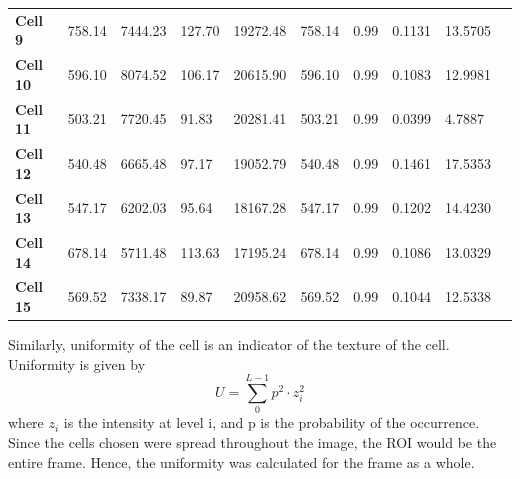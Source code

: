 \documentclass{article}
\begin{document}
\begin{table}[h!]
\begin{tabular}{ |p{1.2cm}|p{1.5cm}|p{1.5cm}|p{1.7cm}|p{1.7cm}|p{1.7cm}|p{1.7cm}|p{1.7cm}|p{1.7cm}|p{1.7cm}| }
\textbf{Cell 9} & 758.14 & 7444.23 & 127.70 & 19272.48 & 758.14 & 0.99 & 0.1131 & 13.5705\\
\textbf{Cell 10} & 596.10 & 8074.52 & 106.17 & 20615.90 & 596.10 & 0.99 & 0.1083 & 12.9981\\
\textbf{Cell 11} & 503.21 & 7720.45 & 91.83 & 20281.41 & 503.21 & 0.99 & 0.0399 & 4.7887\\
\textbf{Cell 12} & 540.48 & 6665.48 & 97.17 & 19052.79 & 540.48 & 0.99 & 0.1461 & 17.5353\\
\textbf{Cell 13} & 547.17 & 6202.03 & 95.64 & 18167.28 & 547.17 & 0.99 & 0.1202 & 14.4230\\
\textbf{Cell 14} & 678.14 & 5711.48 & 113.63 & 17195.24 & 678.14 & 0.99 & 0.1086 &  13.0329\\
\textbf{Cell 15} & 569.52 & 7338.17 & 89.87 & 20958.62 & 569.52 & 0.99 & 0.1044 & 12.5338\\
\hline
\end{tabular}
\end{table}
\clearpage
Similarly, uniformity of the cell is an indicator of the texture of the cell. Uniformity is given by 
\begin{equation*}
    \displaystyle{U} = \sum_0^{L-1}p^2 \cdot z_i^2
\end{equation*}
where $z_i$ is the intensity at level i, and p is the probability of the occurrence. 
Since the cells chosen were spread throughout the image, the ROI would be the entire frame. Hence, the uniformity was calculated for the frame as a whole. 
\end{document}
